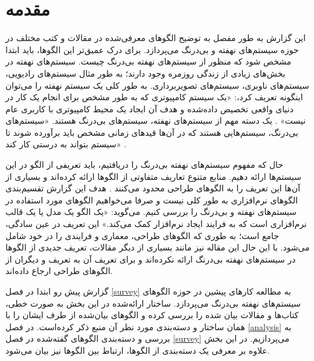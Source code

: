 \setlength\parindent{24pt}
\section{مقدمه}

\begin{RTL}
این گزارش به طور مفصل به توضیح الگوهای معرفی‌شده در مقالات و کتب مختلف
در حوزه سیستم‌های نهفته و بی‌درنگ می‌پردازد.
برای درک عمیق‌تر این الگوها، باید ابتدا مشخص شود که منظور
از سیستم‌های نهفته بی‌درنگ چیست.
سیستم‌های نهفته در بخش‌های زیادی از زندگی روزمره وجود دارند؛
به طور مثال سیستم‌های رادیویی، سیستم‌های ناوبری، سیستم‌های تصویربرداری.
به طور کلی یک سیستم نهفته را می‌توان اینگونه تعریف کرد،:
«یک سیستم کامپیوتری که به طور مشخص برای انجام یک کار در دنیای واقعی
تخصیص داده‌شده و هدف آن ایجاد یک محیط کامپیوتری
با کاربری عام نیست» \cite{ref1}.
یک دسته مهم از سیستم‌های نهفته، سیستم‌های بی‌درنگ هستند.
«سیستم‌های بی‌درنگ، سیستم‌هایی
هستند که در آن‌ها قیدهای زمانی مشخص باید برآورده شوند
تا سیستم بتواند به درستی کار کند» \cite{ref1}.
\end{RTL}

\begin{RTL}
حال که مفهوم سیستم‌های نهفته بی‌درنگ را دریافتیم، باید تعریفی از الگو در این سیستم‌ها
ارائه دهیم. منابع متنوع تعاریف متفاوتی از الگوها ارائه کرده‌اند و بسیاری از آن‌ها
این تعریف را به الگوهای طراحی محدود می‌کنند \cite{ref1}.
هدف این گزارش تقسیم‌بندی الگوهای نرم‌افزاری به طور کلی نیست و صرفا می‌خواهیم
الگوهای مورد استفاده در سیستم‌های نهفته و بی‌درنگ را بررسی کنیم.
 \cite{ref2} می‌گوید:
«یک الگو یک مدل یا یک قالب نرم‌افزاری است که به فرایند ایجاد نرم‌افزار کمک می‌کند.»
این تعریف در عین سادگی، جامع است؛ به طوری که الگوهای طراحی، معماری و فرایندی
را در خود شامل می‌شود. با این حال این مقاله نیز مانند بسیاری از دیگر مقالات،
تعریف جدیدی از الگوها در سیستم‌های نهفته بی‌درنگ ارائه نکرده‌اند و برای تعریف آن به
تعریف  و دیگران \cite{ref3} از الگوهای طراحی ارجاع داده‌اند.
\end{RTL}

\begin{RTL}
گزارش پیش رو ابتدا در فصل \ref{survey} به مطالعه کارهای
پیشین در حوزه الگوهای سیستم‌های نهفته بی‌درنگ می‌پردازد.
ساختار ارائه‌شده در این بخش به صورت خطی، کتاب‌ها و مقالات
بیان شده را بررسی کرده و الگوهای بیان‌شده از طرف ایشان را
با همان ساختار و دسته‌بندی مورد نظر آن منبع ذکر کرده‌است.
در فصل \ref{analysis} به بررسی و دسته‌بندی الگوهای
گفته‌شده در فصل \ref{survey} می‌پردازیم. در این بخش
علاوه بر معرفی یک دسته‌بندی از الگوها، ارتباط بین الگوها نیز بیان می‌شود.
\end{RTL}